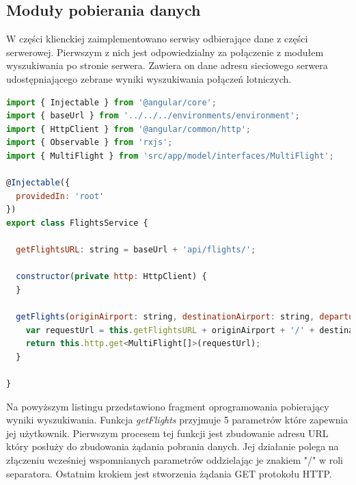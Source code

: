 \documentclass[12pt, twoside]{report}
\begin{document}
\subsection{Moduły pobierania danych}
W części klienckiej zaimplementowano serwisy odbierające dane z części serwerowej. Pierwszym z nich jest odpowiedzialny za połączenie z modułem wyszukiwania po stronie serwera. Zawiera on dane adresu sieciowego serwera udostępniającego zebrane wyniki wyszukiwania połączeń lotniczych.
\begin{lstlisting}[language=JavaScript, caption= Kod źródłowy funkcji pobierającej wyniki z serwera]
import { Injectable } from '@angular/core';
import { baseUrl } from '../../../environments/environment';
import { HttpClient } from '@angular/common/http';
import { Observable } from 'rxjs';
import { MultiFlight } from 'src/app/model/interfaces/MultiFlight';

@Injectable({
  providedIn: 'root'
})
export class FlightsService {

  getFlightsURL: string = baseUrl + 'api/flights/';

  constructor(private http: HttpClient) {
  }

  getFlights(originAirport: string, destinationAirport: string, departureDate: string, typeOfConnection: string, currency: string) : Observable<MultiFlight[]>{
    var requestUrl = this.getFlightsURL + originAirport + '/' + destinationAirport + '/' + departureDate + '/' + typeOfConnection + '/' + currency;
    return this.http.get<MultiFlight[]>(requestUrl);   
  }

}
\end{lstlisting}
Na powyższym listingu przedstawiono fragment oprogramowania pobierający wyniki wyszukiwania. Funkcja \textit{getFlights} przyjmuje 5 parametrów które zapewnia jej użytkownik. Pierwszym procesem tej funkcji jest zbudowanie adresu URL który posłuży do zbudowania żądania pobrania danych. Jej działanie polega na złączeniu wcześniej wspomnianych parametrów oddzielając je znakiem "/" w roli separatora. Ostatnim krokiem jest stworzenia żądania GET protokołu HTTP.
\end{document}
